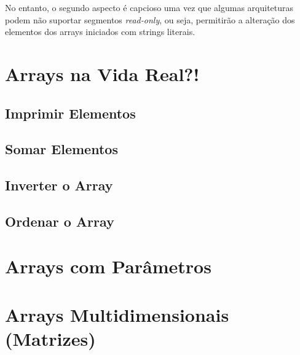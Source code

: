 No entanto, o segundo aspecto é capcioso uma vez que algumas arquiteturas podem não suportar segmentos \textit{read-only}, ou seja, permitirão a alteração dos elementos dos arrays iniciados com strings literais.

\section{Arrays na Vida Real?!}
\subsection{Imprimir Elementos}
\subsection{Somar Elementos}
\subsection{Inverter o Array}
\subsection{Ordenar o Array}

\section{Arrays com Parâmetros}

\section{Arrays Multidimensionais (Matrizes)}



